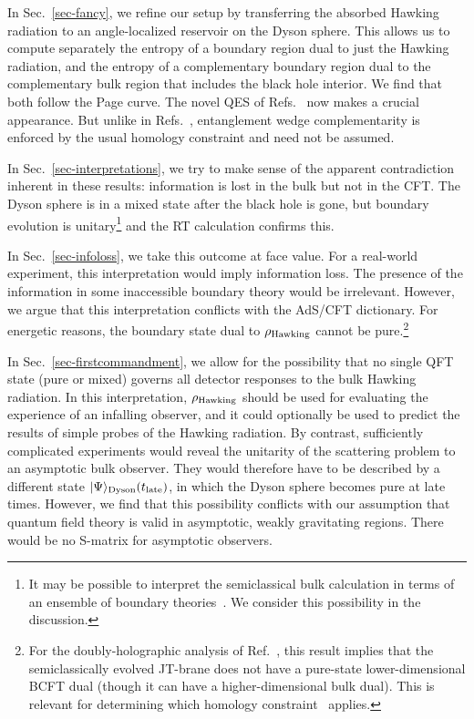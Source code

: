\documentclass[12pt,letterpaper]{article}
\begin{document}
In Sec.~\ref{sec-fancy}, we refine our setup by transferring the absorbed Hawking radiation to an angle-localized reservoir on the Dyson sphere.  This allows us to compute separately the entropy of a boundary region dual to just the Hawking radiation, and the entropy of a complementary boundary region dual to the complementary bulk region that includes the black hole interior. We find that both follow the Page curve. The novel QES of Refs.~\cite{Pen19,AEMM} now makes a crucial appearance. But unlike in Refs.~\cite{Pen19,AEMM}, entanglement wedge complementarity is enforced by the usual homology constraint and need not be assumed.

In Sec.~\ref{sec-interpretations}, we try to make sense of the apparent contradiction inherent in these results: information is lost in the bulk but not in the CFT. The Dyson sphere is in a mixed state after the black hole is gone, but boundary evolution is unitary\footnote{It may be possible to interpret the semiclassical bulk calculation in terms of an ensemble of boundary theories~\cite{SaaShe18,SaaShe19}. We consider this possibility in the discussion.} and the RT calculation confirms this.

In Sec.~\ref{sec-infoloss}, we take this outcome at face value. For a real-world experiment, this interpretation would imply information loss. The presence of the information in some inaccessible boundary theory would be irrelevant. However, we argue that this interpretation conflicts with the AdS/CFT dictionary. For energetic reasons, the boundary state dual to $\rho_{\rm Hawking}$ cannot be pure.\footnote{For the doubly-holographic analysis of Ref.~\cite{AMMZ,AlmMah19}, this result implies that the semiclassically evolved JT-brane does not have a pure-state lower-dimensional BCFT dual (though it can have a higher-dimensional bulk dual). This is relevant for determining which homology constraint~\cite{RyuTak06,Tak11} applies.}

In Sec.~\ref{sec-firstcommandment}, we allow for the possibility that no single QFT state (pure or mixed) governs all detector responses to the bulk Hawking radiation. In this interpretation, $\rho_{\rm Hawking}$ should be used for evaluating the experience of an infalling observer, and it could optionally be used to predict the results of simple probes of the Hawking radiation. By contrast, sufficiently complicated experiments would reveal the unitarity of the scattering problem to an asymptotic bulk observer. They would therefore have to be described by a different state $|\Psi\rangle_{\rm Dyson}(t_{\rm late})$, in which the Dyson sphere becomes pure at late times. However, we find that this possibility conflicts with our assumption that quantum field theory is valid in asymptotic, weakly gravitating regions. There would be no S-matrix for asymptotic observers.
\end{document}
